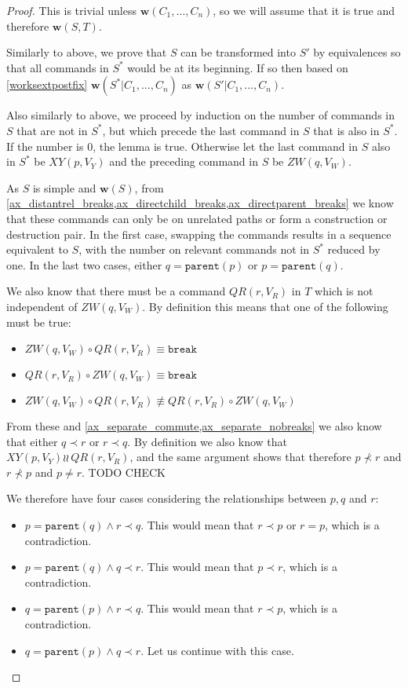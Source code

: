 \documentclass[12pt]{article}
\newcommand{\parent}{\mathtt{parent}}
\newcommand{\cbrk}{\mathtt{break}}
\newcommand{\fscommand}[2]{{#1#2}}
\newcommand{\cxy}{\fscommand{X}{Y}}
\newcommand{\czw}{\fscommand{Z}{W}}
\newcommand{\cqr}{\fscommand{Q}{R}}
\newcommand{\cc}{\circ} %
\newcommand{\descendant}{\prec}
\newcommand{\nequiv}{\not\equiv}
\newcommand{\indep}{\wr\!\!\wr\,} %
\newcommand{\works}[1]{{\mathbf{w}}({#1})}
\newcommand{\worksc}[2]{{\mathbf{w}}({#1}|{#2})}
\theoremstyle{definition}
\begin{document}
\begin{proof}
This is trivial unless $\works{C_1,\ldots,C_n}$, so we will assume that it is true
and therefore $\works{S,T}$.

Similarly to above, we prove that $S$ can be transformed into $S'$ by equivalences
so that all commands in $S^*$ would be at its beginning.
If so then based on \cref{worksextpostfix}
$\worksc{S^*}{C_1,\ldots,C_n}$ as $\worksc{S'}{C_1,\ldots,C_n}$.

Also similarly to above,
we proceed by induction on the number of commands in $S$ that are not in $S^*$, but which precede
the last command in $S$ that is also in $S^*$.
If the number is 0, the lemma is true.
Otherwise let the last command in $S$ also in $S^*$ be $\cxy(p,V_Y)$
and the preceding command in $S$ be $\czw(q,V_W)$.

As $S$ is simple and $\works{S}$, from 
\cref{ax_distantrel_breaks,ax_directchild_breaks,ax_directparent_breaks}
we know that these commands can only be on unrelated paths or form a construction or destruction pair.
In the first case, swapping the commands results in a sequence equivalent to $S$,
with the number on relevant commands not in $S^*$ reduced by one.
In the last two cases,
either $q=\parent(p)$ or $p=\parent(q)$.

We also know that there must be a command $\cqr(r,V_R)$ in $T$ which is not independent of $\czw(q,V_W)$.
By definition this means that one of the following must be true:
\begin{itemize}
\item $\czw(q,V_W)\cc \cqr(r,V_R) \equiv\cbrk$
\item $\cqr(r,V_R)\cc \czw(q,V_W) \equiv\cbrk$
\item $\czw(q,V_W)\cc \cqr(r,V_R) \nequiv \cqr(r,V_R)\cc \czw(q,V_W)$
\end{itemize}
From these and \cref{ax_separate_commute,ax_separate_nobreaks} we also know that
either $q\descendant r$ or $r\descendant q$.
By definition we also know that $\cxy(p,V_Y)\indep \cqr(r,V_R)$,
and the same argument shows that therefore
$p\not\descendant r$ and $r\not\descendant p$ and $p\neq r$. TODO CHECK

We therefore have four cases considering the relationships between $p,q$ and $r$:
\begin{itemize}
\item $p=\parent(q) \wedge r\descendant q$.
   This would mean that $r\descendant p$ or $r=p$, which is a contradiction.
\item $p=\parent(q) \wedge q\descendant r$.
   This would mean that $p\descendant r$, which is a contradiction.
\item $q=\parent(p) \wedge r\descendant q$.
   This would mean that $r\descendant p$, which is a contradiction.  
\item $q=\parent(p) \wedge q\descendant r$.
   Let us continue with this case.
\end{itemize}


\end{proof}
\end{document}
